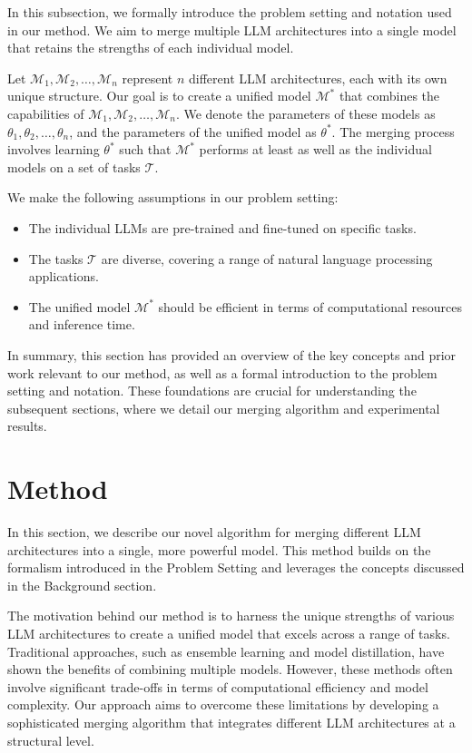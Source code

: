 \documentclass{article} %
\begin{document}
In this subsection, we formally introduce the problem setting and notation used in our method. We aim to merge multiple LLM architectures into a single model that retains the strengths of each individual model.

Let $\mathcal{M}_1, \mathcal{M}_2, \ldots, \mathcal{M}_n$ represent $n$ different LLM architectures, each with its own unique structure. Our goal is to create a unified model $\mathcal{M}^*$ that combines the capabilities of $\mathcal{M}_1, \mathcal{M}_2, \ldots, \mathcal{M}_n$. We denote the parameters of these models as $\theta_1, \theta_2, \ldots, \theta_n$, and the parameters of the unified model as $\theta^*$. The merging process involves learning $\theta^*$ such that $\mathcal{M}^*$ performs at least as well as the individual models on a set of tasks $\mathcal{T}$.

We make the following assumptions in our problem setting:
\begin{itemize}
    \item The individual LLMs are pre-trained and fine-tuned on specific tasks.
    \item The tasks $\mathcal{T}$ are diverse, covering a range of natural language processing applications.
    \item The unified model $\mathcal{M}^*$ should be efficient in terms of computational resources and inference time.
\end{itemize}

In summary, this section has provided an overview of the key concepts and prior work relevant to our method, as well as a formal introduction to the problem setting and notation. These foundations are crucial for understanding the subsequent sections, where we detail our merging algorithm and experimental results.

\section{Method}
\label{sec:method}

In this section, we describe our novel algorithm for merging different LLM architectures into a single, more powerful model. This method builds on the formalism introduced in the Problem Setting and leverages the concepts discussed in the Background section.

The motivation behind our method is to harness the unique strengths of various LLM architectures to create a unified model that excels across a range of tasks. Traditional approaches, such as ensemble learning and model distillation, have shown the benefits of combining multiple models. However, these methods often involve significant trade-offs in terms of computational efficiency and model complexity. Our approach aims to overcome these limitations by developing a sophisticated merging algorithm that integrates different LLM architectures at a structural level.
\end{document}
